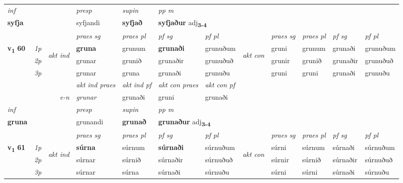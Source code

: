 \begin{longtable}[l]{X>{\footnotesize\itshape}llXXXXlXXXX}
\cmidrule{4-7}
   {\textit{inf}} & &     & \textit{presp} & \textit{supin}  & \textit{pp m} \\*
  {\textbf{syfja}} & &     & syfjandi &  \textbf{syfjað}  & \multicolumn{2}{l}{\textbf{syfjaður} adj\textbf{\textsubscript{3-4}}} \\*

\midrule

 & &   & \textit{praes sg}  & \textit{praes pl}    & \textit{ pf sg} & \textit{pf pl} & & \textit{praes sg}  & \textit{praes pl}    & \textit{pf sg} & \textit{pf pl }  \\ \cmidrule{4-7} \cmidrule{9-12}
 \multirow{2}{*}{{{\textbf{v{\textsubscript{1}}} \Large{\textbf{60}}}}}  & 1p & \multirow{3}{*}{\begin{turn}{90}\textit{akt ind}\end{turn}} & \textbf{gruna} & grunum & \textbf{grunaði} & grunuðum & \multirow{3}{*}{\begin{turn}{90}\textit{akt con}\end{turn}} &gruni & grunum & grunaði & grunuðum\\*
 & 2p &  &  grunar  & grunið & grunaðir & grunuðuð & & grunir & grunið & grunaðir & grunuðuð \\*
 & 3p &  & grunar & gruna & grunaði & grunuðu & & gruni & gruni& grunaði & grunuðu \\*
\cmidrule{4-7} \cmidrule{9-12}

   && &  \textit{akt ind praes} & \textit{akt ind pf} & \textit{akt con praes} & \textit{akt con pf} \\*
\multicolumn{3}{r}{\textit{e-n}} & grunar & grunaði & gruni & grunaði \\*

\cmidrule{4-7}
   {\textit{inf}} & &     & \textit{presp} & \textit{supin}  & \textit{pp m} \\*
  {\textbf{gruna}} & &     & grunandi &  \textbf{grunað}  & \multicolumn{2}{l}{\textbf{grunaður} adj\textbf{\textsubscript{3-4}}} \\*

\midrule

 & &   & \textit{praes sg}  & \textit{praes pl}    & \textit{ pf sg} & \textit{pf pl} & & \textit{praes sg}  & \textit{praes pl}    & \textit{pf sg} & \textit{pf pl }  \\ \cmidrule{4-7} \cmidrule{9-12}
 \multirow{2}{*}{{{\textbf{v{\textsubscript{1}}} \Large{\textbf{61}}}}}  & 1p & \multirow{3}{*}{\begin{turn}{90}\textit{akt ind}\end{turn}} & \textbf{súrna} & súrnum & \textbf{súrnaði} & súrnuðum & \multirow{3}{*}{\begin{turn}{90}\textit{akt con}\end{turn}} &súrni & súrnum & súrnaði & súrnuðum\\*
 & 2p &  &  súrnar  & súrnið & súrnaðir & súrnuðuð & & súrnir & súrnið & súrnaðir & súrnuðuð \\*
 & 3p &  & súrnar & súrna & súrnaði & súrnuðu & & súrni & súrni& súrnaði & súrnuðu \\*
\cmidrule{4-7} \cmidrule{9-12}


\end{longtable}
